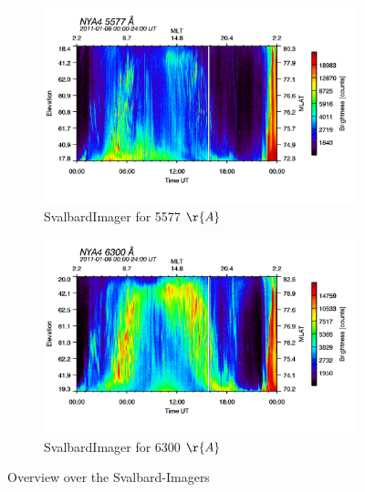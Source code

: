 \documentclass[10pt,a4paper]{article}
\begin{document}
\begin{figure}[h]
\centering
\begin{subfigure}{0.45\textwidth}
\centering
	\includegraphics[width=\textwidth]{SvalbardImager5577A.png}
	\caption{ SvalbardImager for 5577 $\r{A}$ \label{SBI_5_overview}}
\end{subfigure}
\begin{subfigure}{0.45\textwidth}
\centering
	\includegraphics[width=\textwidth]{SvalbardImager6300A.png}
	\caption{ SvalbardImager for 6300 $\r{A}$\label{SBI_6_overview}}
\end{subfigure}
\caption{Overview over the Svalbard-Imagers}
\end{figure}
\end{document}
